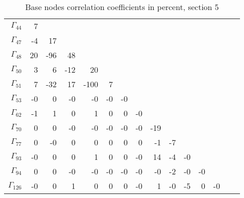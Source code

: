 {\begin{table}
\begin{center}
\begin{minipage}{\linewidth}
\begin{center}
\begin{envsmall}
\begin{center}
\begin{tabular}{rrrrrrrrrrrrrrr}
\end{tabular}
\end{center}
\end{envsmall}
\ifhevea\else
\end{center}
\end{minipage}
\fi
\end{center}
\ifhevea\end{table}\fi
\ifhevea\begin{table}\fi%
\begin{center}
\ifhevea
\caption{Base nodes correlation coefficients in percent, section 5\label{tab:tau:br-fit-corr5}}%
\else
\begin{minipage}{\linewidth}
\begin{center}
\label{tab:tau:br-fit-corr5}%
\fi
\begin{envsmall}
\begin{center}
\renewcommand*{\arraystretch}{1.1}%
\begin{tabular}{rrrrrrrrrrrrrrr}
\hline
\( \Gamma_{44} \) &    7 &  &  &  &  &  &  &  &  &  &  &  &  &  \\
\( \Gamma_{47} \) &   -4 &   17 &  &  &  &  &  &  &  &  &  &  &  &  \\
\( \Gamma_{48} \) &   20 &  -96 &   48 &  &  &  &  &  &  &  &  &  &  &  \\
\( \Gamma_{50} \) &    3 &    6 &  -12 &   20 &  &  &  &  &  &  &  &  &  &  \\
\( \Gamma_{51} \) &    7 &  -32 &   17 & -100 &    7 &  &  &  &  &  &  &  &  &  \\
\( \Gamma_{53} \) &   -0 &    0 &   -0 &   -0 &   -0 &   -0 &  &  &  &  &  &  &  &  \\
\( \Gamma_{62} \) &   -1 &    1 &    0 &    1 &    0 &    0 &   -0 &  &  &  &  &  &  &  \\
\( \Gamma_{70} \) &    0 &    0 &   -0 &   -0 &   -0 &   -0 &   -0 &  -19 &  &  &  &  &  &  \\
\( \Gamma_{77} \) &    0 &   -0 &    0 &    0 &    0 &    0 &    0 &   -1 &   -7 &  &  &  &  &  \\
\( \Gamma_{93} \) &   -0 &    0 &    0 &    1 &    0 &    0 &   -0 &   14 &   -4 &   -0 &  &  &  &  \\
\( \Gamma_{94} \) &    0 &    0 &   -0 &   -0 &   -0 &   -0 &   -0 &   -0 &   -2 &   -0 &   -0 &  &  &  \\
\( \Gamma_{126} \) &   -0 &    0 &    1 &    0 &    0 &    0 &   -0 &    1 &   -0 &   -5 &    0 &   -0 &  &  \\

\end{tabular}
\end{center}
\end{envsmall}
\end{center}
\end{minipage}
\end{center}
\end{table}}
